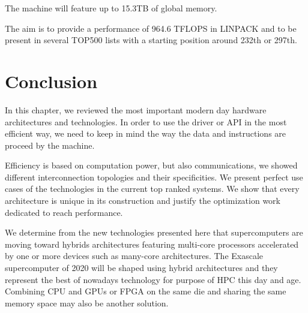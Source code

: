 The machine will feature up to 15.3TB of global memory. 

The aim is to provide a performance of 964.6 TFLOPS in LINPACK and to be present in several TOP500 lists with a starting position around 232th or 297th. 

\section{Conclusion}

In this chapter, we reviewed the most important modern day hardware architectures and technologies. 
In order to use the driver or API in the most efficient way, we need to keep in mind the way the data and instructions are proceed by the machine. 

Efficiency is based on computation power, but also communications, we showed different interconnection topologies and their specificities. 
We present perfect use cases of the technologies in the current top ranked systems.
We show that every architecture is unique in its construction and justify the optimization work dedicated to reach performance. 

We determine from the new technologies presented here that supercomputers are moving toward hybrids architectures featuring multi-core processors accelerated by one or more devices such as many-core architectures. 
The Exascale supercomputer of 2020 will be shaped using hybrid architectures and they represent the best of nowadays technology for purpose of HPC this day and age. 
Combining CPU and GPUs or FPGA on the same die and sharing the same memory space may also be another solution.
